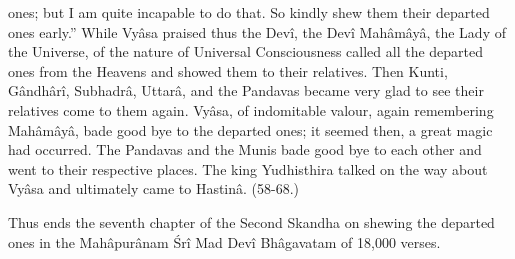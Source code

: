 ones; but I am quite incapable to do that. So kindly shew them their departed ones early.'' While Vy\^asa praised thus the Dev\^i, the Dev\^i Mah\^am\^ay\^a, the Lady of the Universe, of the nature of Universal Consciousness called all the departed ones from the Heavens and showed them to their relatives. Then Kunti, G\^andh\^ar\^i, Subhadr\^a, Uttar\^a, and the Pandavas became very glad to see their relatives come to them again. Vy\^asa, of indomitable valour, again remembering Mah\^am\^ay\^a, bade good bye to the departed ones; it seemed then, a great magic had occurred. The Pandavas and the Munis bade good bye to each other and went to their respective places. The king Yudhisthira talked on the way about Vy\^asa and ultimately came to Hastin\^a. (58-68.)

Thus ends the seventh chapter of the Second Skandha on shewing the departed ones in the Mah\^apur\^anam \'Sr\^i Mad Dev\^i Bh\^agavatam of 18,000 verses.